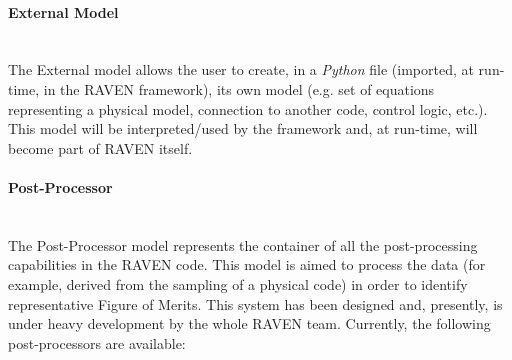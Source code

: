 \paragraph{External Model} ~\\
The External model allows the user to create, in a \textit{Python} file (imported, at run-time, in the RAVEN framework), its own model (e.g. set of equations representing a physical model, connection to another code, control logic, etc.). This model will be interpreted/used by the framework and, at run-time, will become part of RAVEN itself.
\paragraph{Post-Processor} ~\\
The Post-Processor model represents the container of all the post-processing capabilities in the RAVEN code. This model is aimed to process the data (for example, derived from the sampling of a physical code) in order to identify representative Figure of Merits. This system has  been designed and, presently, is under heavy development by the whole RAVEN team.  Currently, the following post-processors are available:
